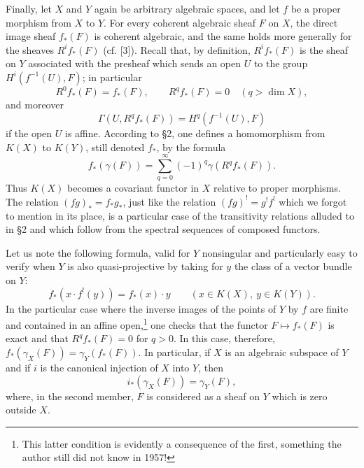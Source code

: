 Finally, let $X$ and $Y$ again be arbitrary algebraic spaces, and let $f$ be a proper morphism from $X$ to $Y$. For every coherent algebraic sheaf $F$ on $X$, the direct image sheaf $f_*(F)$ is coherent algebraic, and the same holds more generally for the sheaves $R^if_*(F)$ (cf. [3]). Recall that, by definition, $R^if_*(F)$ is the sheaf on $Y$ associated with the presheaf which sends an open $U$ to the group $H^i(f^{-1}(U),F)$; in particular
\begin{equation}\tag{2.24}
 R^0f_*(F)=f_*(F),\qquad R^qf_*(F)=0\quad(q>\dim X),
\end{equation}
and moreover
\begin{equation}\tag{2.25}
 \Gamma(U,R^qf_*(F))=H^q(f^{-1}(U),F)
\end{equation}
if the open $U$ is affine. According to \S 2, one defines a homomorphism from $K(X)$ to $K(Y)$, still denoted $f_*$, by the formula
\begin{equation}\tag{2.26}
 f_*(\gamma(F))=\sum_{q=0}^{\infty}(-1)^q\gamma(R^qf_*(F)).
\end{equation}
Thus $K(X)$ becomes a covariant functor in $X$ relative to proper morphisms. The relation $(fg)_*=f_*g_*$, just like the relation $(fg)^!=g^!f^!$ which we forgot to mention in its place, is a particular case of the transitivity relations alluded to in \S 2 and which follow from the spectral sequences of composed functors.

Let us note the following formula, valid for $Y$ nonsingular and particularly easy to verify when $Y$ is also quasi-projective by taking for $y$ the class of a vector bundle on $Y$:
\begin{equation}\tag{2.27}
 f_*(x\cdot f^!(y))=f_*(x)\cdot y\qquad (x\in K(X),\ y\in K(Y)).
\end{equation}
In the particular case where the inverse images of the points of $Y$ by $f$ are finite and contained in an affine open,\footnote{This latter condition is evidently a consequence of the first, something the author still did not know in 1957!} one checks that the functor $F\mapsto f_*(F)$ is exact and that $R^qf_*(F)=0$ for $q>0$. In this case, therefore, $f_*(\gamma_X(F))=\gamma_Y(f_*(F))$. In particular, if $X$ is an algebraic subspace of $Y$ and if $i$ is the canonical injection of $X$ into $Y$, then
\begin{equation}\tag{2.28}
 i_*(\gamma_X(F))=\gamma_Y(F),
\end{equation}
where, in the second member, $F$ is considered as a sheaf on $Y$ which is zero outside $X$.

